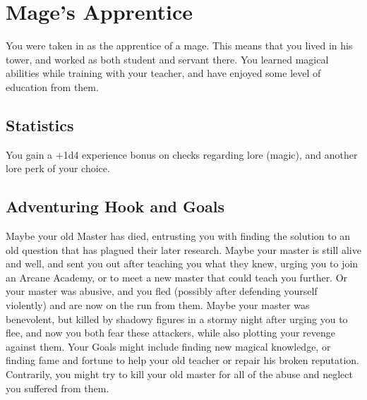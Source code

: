 \section{Mage's Apprentice}\label{background:mageApprentice}
You were taken in as the apprentice of a mage.
This means that you lived in his tower, and worked as both student and servant there.
You learned magical abilities while training with your teacher, and have enjoyed some level of education from them.

\subsection{Statistics}
You gain a +1d4 experience bonus on checks regarding lore (magic), and another lore perk of your choice.

\subsection{Adventuring Hook and Goals}
Maybe your old Master has died, entrusting you with finding the solution to an old question that has plagued their later research.
Maybe your master is still alive and well, and sent you out after teaching you what they knew, urging you to join an Arcane Academy, or to meet a new master that could teach you further.
Or your master was abusive, and you fled (possibly after defending yourself violently) and are now on the run from them.
Maybe your master was benevolent, but killed by shadowy figures in a stormy night after urging you to flee, and now you both fear these attackers, while also plotting your revenge against them.
Your Goals might include finding new magical knowledge, or finding fame and fortune to help your old teacher or repair his broken reputation.
Contrarily, you might try to kill your old master for all of the abuse and neglect you suffered from them.